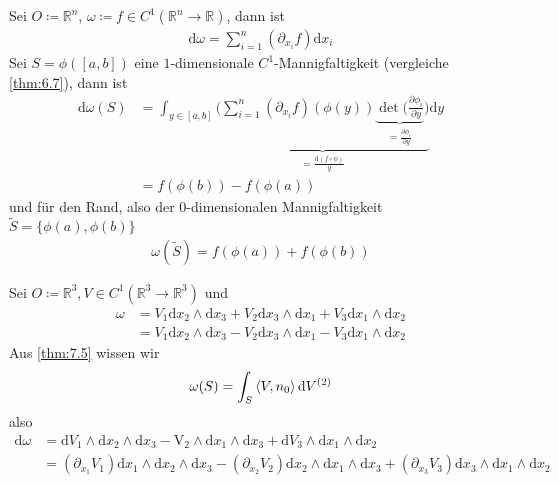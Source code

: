 \begin{example} \label{thm:8.4}
  \begin{enum-arab}
  \item
    Sei $O \coloneq \mathbb{R}^n$, $\omega \coloneq f \in C^1 (\mathbb{R}^n \to \mathbb{R})$, dann ist
    \begin{align*}
      \mathrm d \omega = \sum_{i=1}^n (\partial_{x_i}f) \mathrm d x_i
    \end{align*}
    Sei $S = \phi([a,b])$ eine $1$-dimensionale $C^1$-Mannigfaltigkeit (vergleiche \ref{thm:6.7}), dann ist
    \begin{align*}
      \mathrm d \omega(S) &= \int_{y \in [a,b]} \underbrace{\bigg( \sum_{i=1}^n (\partial_{x_i}f)(\phi(y)) \underbrace{\det ( \tfrac{\partial \phi_i}{\partial y}}_{= \frac{\partial \phi_i}{\partial y}} \bigg)}_{= \frac{\mathrm d (f\circ \phi)}{y}} \mathrm d y \\
      &= f(\phi(b)) - f(\phi(a))
    \end{align*}
    und für den Rand, also der $0$-dimensionalen Mannigfaltigkeit $\tilde S = \{\phi(a), \phi(b)\}$
    \begin{align*}
      \omega(\tilde S) = f(\phi(a)) + f(\phi(b))
    \end{align*}
  \item
    Sei $O \coloneq \mathbb{R}^3, V \in C^1 (\mathbb{R}^3 \to \mathbb{R}^3)$ und
    \begin{align*}
      \omega &= V_1 \mathrm d x_2 \wedge \mathrm d x_3 + V_2 \mathrm d x_3 \wedge \mathrm d x_1 + V_3 \mathrm d x_1 \wedge \mathrm d x_2 \\
      &= V_1 \mathrm d x_2 \wedge \mathrm d x_3 - V_2 \mathrm d x_3 \wedge \mathrm d x_1 - V_3 \mathrm d x_1 \wedge \mathrm d x_2
    \end{align*}
    Aus \ref{thm:7.5} wissen wir
    \begin{align*}
      \omega(S) = \int_S \braket{V, n_0} \mathrm d V^{(2)}
    \end{align*}
    also
    \begin{align*}
      \mathrm d \omega &= \mathrm d V_1 \wedge \mathrm d x_2 \wedge \mathrm d x_3 - \mathrm V_2 \wedge \mathrm d x_1 \wedge \mathrm d x_3 + \mathrm d V_3 \wedge \mathrm d x_1 \wedge \mathrm d x_2 \\
      &= (\partial_{x_1} V_1) \mathrm d x_1 \wedge \mathrm d x_2 \wedge \mathrm d x_3 - (\partial_{x_2} V_2) \mathrm d x_2 \wedge \mathrm d x_1 \wedge \mathrm d x_3 + (\partial_{x_3} V_3) \mathrm d x_3 \wedge \mathrm d x_1 \wedge \mathrm d x_2 \\

\end{align*}
\end{enum-arab}
\end{example}
